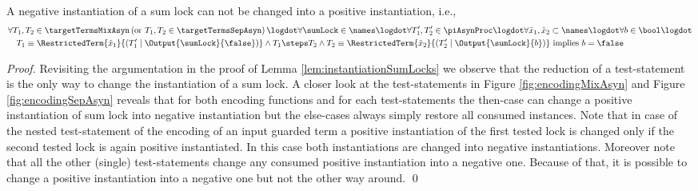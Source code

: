 \documentclass[]{llncs}
\begin{document}
\begin{lemma} \label{lem:changeInstantiationSumLock}
	A negative instantiation of a sum lock can not be changed into a positive instantiation, i.e.,
	\begin{align*}
		& \forall T_1, T_2 \in \targetTermsMixAsyn \left( \text{or } T_1, T_2 \in \targetTermsSepAsyn \right) \logdot \forall \sumLock \in \names \logdot \forall T_1', T_2' \in \piAsynProc \logdot \forall \tilde{x}_1, \tilde{x}_2 \subset \names \logdot \forall b \in \bool \logdot\\
		& \hspace*{1em} T_1 \equiv \RestrictedTerm{\tilde{x}_1}{\left( T_1' \mid \Output{\sumLock}{\false} \right)} \wedge T_1 \steps T_2 \wedge T_2 \equiv \RestrictedTerm{\tilde{x}_2}{\left( T_2' \mid \Output{\sumLock}{b} \right)} \text{ implies } b = \false
	\end{align*}
\end{lemma}

\begin{proof}
	Revisiting the argumentation in the proof of Lemma \ref{lem:instantiationSumLocks} we observe that the reduction of a test-statement is the only way to change the instantiation of a sum lock. A closer look at the test-statements in Figure \ref{fig:encodingMixAsyn} and Figure \ref{fig:encodingSepAsyn} reveals that for both encoding functions and for each test-statements the then-case can change a positive instantiation of sum lock into negative instantiation but the else-cases always simply restore all consumed instances. Note that in case of the nested test-statement of the encoding of an input guarded term a positive instantiation of the first tested lock is changed only if the second tested lock is again positive instantiated. In this case both instantiations are changed into negative instantiations. Moreover note that all the other (single) test-statements change any consumed positive instantiation into a negative one. Because of that, it is possible to change a positive instantiation into a negative one but not the other way around.
	\qed
\end{proof}
\end{document}
